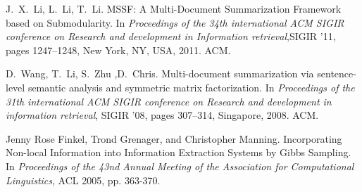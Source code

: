 \documentclass[envcountsame]{llncs}
\begin{document}
\begin{thebibliography}{10}
J.~X.~Li, L.~Li, T.~Li.
\newblock MSSF: A Multi-Document Summarization Framework based on Submodularity.
\newblock  In {\em Proceedings of the 34th international ACM SIGIR conference on Research and development in Information retrieval},SIGIR '11, pages 1247--1248, New York, NY, USA, 2011. ACM.

D.~Wang, T.~Li, S.~Zhu ,D.~Chris.
\newblock Multi-document summarization via sentence-level semantic analysis and symmetric matrix factorization.
\newblock In {\em Proceedings of the 31th international ACM SIGIR conference on
  Research and development in information retrieval}, SIGIR '08, pages
  307--314, Singapore, 2008. ACM.

Jenny Rose Finkel, Trond Grenager, and Christopher Manning.
\newblock Incorporating Non-local Information into Information Extraction Systems by Gibbs Sampling. 
\newblock In {\em Proceedings of the 43nd Annual Meeting of the Association for Computational Linguistics}, ACL 2005, pp. 363-370. 

\end{thebibliography}
\end{document}
